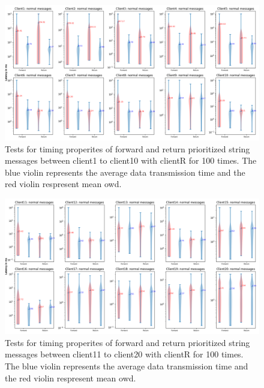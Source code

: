 \begin{figure}
    \centering
    \includegraphics[width=\textheight]{figures/appendix/priority_tests/log_violin_50clients_string_figure_1.png}\hfill 
    \caption{Tests for timing properites of forward and return prioritized string messages between client1 to client10 
    with clientR for 100 times. The blue violin represents the average data transmission time and the red violin 
    respresent mean \gls{owd}.} \label{fig: priority-50clients-string-a}
\end{figure}

\begin{figure}
    \includegraphics[width=\textheight]{figures/appendix/priority_tests/log_violin_50clients_string_figure_2.png}\hfill 
    \caption{Tests for timing properites of forward and return prioritized string messages between client11 to client20 
    with clientR for 100 times. The blue violin represents the average data transmission time and the red violin 
    respresent mean \gls{owd}.} \label{fig: priority-50clients-string-b}
\end{figure}

